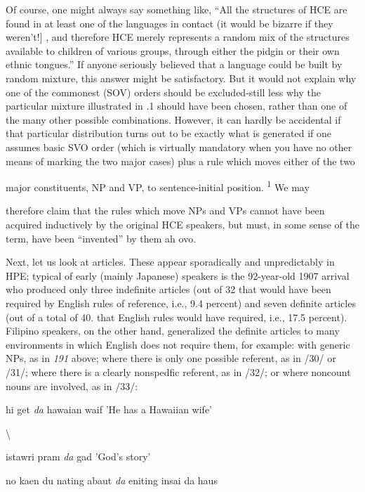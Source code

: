 Of course, one might always say something like, ``All the struc\-tures of HCE are found in at least one of the languages in contact (it would be bizarre if they weren't!] , and therefore HCE merely repre\-sents a random mix of the structures available to children of various groups, through either the pidgin or their own ethnic tongues.'' If anyone seriously believed that a language could be built by random mixture, this answer might be satisfactory. But it would not explain why one of the commonest (SOV) orders should be excluded-still less why the particular mixture illustrated in .1 should have been chosen, rather than one of the many other possible combinations. However, it can hardly be accidental if that particular distribution turns out to be exactly what is generated if one assumes basic SVO order (which is virtually mandatory when you have no other means of mark\-ing the two major cases) plus a rule which moves either of the two

major constituents, NP and VP, to sentence-initial position. \textsuperscript{1} We may

therefore claim that the rules which move NPs and VPs cannot have been acquired inductively by the original HCE speakers, but must, in some sense of the term, have been ``invented'' by them ah ovo.

Next, let us look at articles. These appear sporadically and unpredictably in HPE; typical of early (mainly Japanese) speakers is the 92-year-old 1907 arrival who produced only three indefinite articles (out of 32 that would have been required by English rules of reference, i.e., 9.4 percent) and seven definite articles (out of a total of 40. that English rules would have required, i.e., 17.5 percent). Filipino speakers, on the other hand, generalized the definite articles to many environ\-ments in which English does not require them, for example: with generic NPs, as in \textit{191} above; where there is only one possible refer\-ent, as in /30/ or /31/; where there is a clearly nonspedfic referent, as in /32/; or where noncount nouns are involved, as in /33/:

\ea\label{ex:30}
 hi get \textit{da} hawaian waif 'He has a Hawaiian wife'
\glt
\z

{\textbackslash}


\ea\label{ex:31}
 istawri pram \textit{da} gad 'God's story'
\glt
\z

\ea\label{ex:32}
 no kaen du nating abaut \textit{da} eniting insai da haus
\glt
\z

